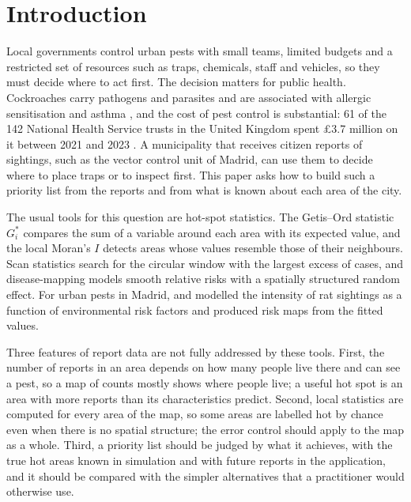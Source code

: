 \section{Introduction}\label{sec1}

Local governments control urban pests with small teams, limited budgets and a restricted set of resources such as traps, chemicals, staff and vehicles, so they must decide where to act first. The decision matters for public health. Cockroaches carry pathogens and parasites \citep{kalantari2023first,abdullah2024cockroaches} and are associated with allergic sensitisation and asthma \citep{liccardi2023narrative}, and the cost of pest control is substantial: 61 of the 142 National Health Service trusts in the United Kingdom spent \pounds3.7 million on it between 2021 and 2023 \citep{libdems}. A municipality that receives citizen reports of sightings, such as the vector control unit of Madrid, can use them to decide where to place traps or to inspect first. This paper asks how to build such a priority list from the reports and from what is known about each area of the city.

The usual tools for this question are hot-spot statistics. The Getis--Ord statistic $G_i^*$ \citep{getis1992analysis,ord1995local} compares the sum of a variable around each area with its expected value, and the local Moran's $I$ \citep{anselin1995local} detects areas whose values resemble those of their neighbours. Scan statistics \citep{kulldorff1997spatial} search for the circular window with the largest excess of cases, and disease-mapping models \citep{besag1991bayesian} smooth relative risks with a spatially structured random effect. For urban pests in Madrid, \citet{tamayo2014risk} and \citet{ayyad2018non,ayyad2019trivariate} modelled the intensity of rat sightings as a function of environmental risk factors and produced risk maps from the fitted values.

Three features of report data are not fully addressed by these tools. First, the number of reports in an area depends on how many people live there and can see a pest, so a map of counts mostly shows where people live; a useful hot spot is an area with more reports than its characteristics predict. Second, local statistics are computed for every area of the map, so some areas are labelled hot by chance even when there is no spatial structure; the error control should apply to the map as a whole. Third, a priority list should be judged by what it achieves, with the true hot areas known in simulation and with future reports in the application, and it should be compared with the simpler alternatives that a practitioner would otherwise use.

